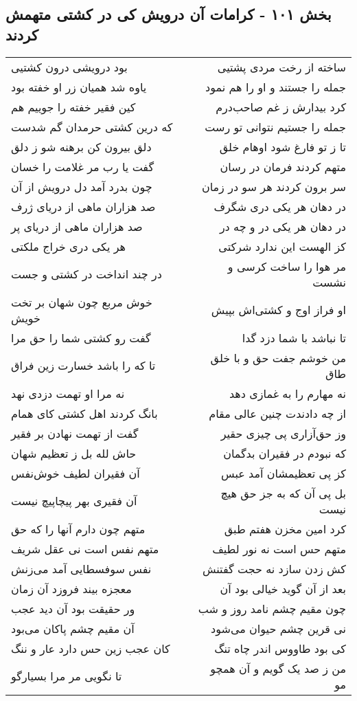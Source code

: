 \begin{center}
\section*{بخش ۱۰۱ - کرامات آن درویش کی در کشتی متهمش کردند}
\label{sec:sh101}
\begin{longtable}{l p{0.5cm} r}
بود درویشی درون کشتیی
&&
ساخته از رخت مردی پشتیی
\\
یاوه شد همیان زر او خفته بود
&&
جمله را جستند و او را هم نمود
\\
کین فقیر خفته را جوییم هم
&&
کرد بیدارش ز غم صاحب‌درم
\\
که درین کشتی حرمدان گم شدست
&&
جمله را جستیم نتوانی تو رست
\\
دلق بیرون کن برهنه شو ز دلق
&&
تا ز تو فارغ شود اوهام خلق
\\
گفت یا رب مر غلامت را خسان
&&
متهم کردند فرمان در رسان
\\
چون بدرد آمد دل درویش از آن
&&
سر برون کردند هر سو در زمان
\\
صد هزاران ماهی از دریای ژرف
&&
در دهان هر یکی دری شگرف
\\
صد هزاران ماهی از دریای پر
&&
در دهان هر یکی در و چه در
\\
هر یکی دری خراج ملکتی
&&
کز الهست این ندارد شرکتی
\\
در چند انداخت در کشتی و جست
&&
مر هوا را ساخت کرسی و نشست
\\
خوش مربع چون شهان بر تخت خویش
&&
او فراز اوج و کشتی‌اش بپیش
\\
گفت رو کشتی شما را حق مرا
&&
تا نباشد با شما دزد گدا
\\
تا که را باشد خسارت زین فراق
&&
من خوشم جفت حق و با خلق طاق
\\
نه مرا او تهمت دزدی نهد
&&
نه مهارم را به غمازی دهد
\\
بانگ کردند اهل کشتی کای همام
&&
از چه دادندت چنین عالی مقام
\\
گفت از تهمت نهادن بر فقیر
&&
وز حق‌آزاری پی چیزی حقیر
\\
حاش لله بل ز تعظیم شهان
&&
که نبودم در فقیران بدگمان
\\
آن فقیران لطیف خوش‌نفس
&&
کز پی تعظیمشان آمد عبس
\\
آن فقیری بهر پیچاپیچ نیست
&&
بل پی آن که به جز حق هیچ نیست
\\
متهم چون دارم آنها را که حق
&&
کرد امین مخزن هفتم طبق
\\
متهم نفس است نی عقل شریف
&&
متهم حس است نه نور لطیف
\\
نفس سوفسطایی آمد می‌زنش
&&
کش زدن سازد نه حجت گفتنش
\\
معجزه بیند فروزد آن زمان
&&
بعد از آن گوید خیالی بود آن
\\
ور حقیقت بود آن دید عجب
&&
چون مقیم چشم نامد روز و شب
\\
آن مقیم چشم پاکان می‌بود
&&
نی قرین چشم حیوان می‌شود
\\
کان عجب زین حس دارد عار و ننگ
&&
کی بود طاووس اندر چاه تنگ
\\
تا نگویی مر مرا بسیارگو
&&
من ز صد یک گویم و آن همچو مو
\\
\end{longtable}
\end{center}
